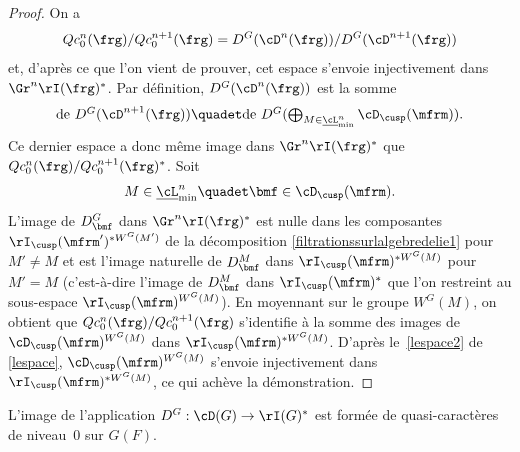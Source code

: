 \begin{proof}
On a
\[
Qc_{0}^n(\frg)/Qc_{0}^{n+1}(\frg)=D^G(\cD^n(\frg))/D^G(\cD^{n+1}(\frg))
\]
et, d'après ce que l'on vient de prouver, cet espace s'envoie injectivement dans $\Gr^n\rI(\frg)^*$.
Par définition, $D^G(\cD^n(\frg))$ est la somme
\[\textstyle
\text{de }D^G(\cD^{n+1}(\frg))\quadet \text{de }D^G(\bigoplus_{M\in \underline{\cL}_{\min}^n}\cD_{\cusp}(\mfrm)).
\]
Ce dernier espace a donc même image dans $\Gr^n\rI(\frg)^*$ que $Qc_{0}^n(\frg)/Qc_{0}^{n+1}(\frg)^*$. Soit
\[
M\in \underline{\cL}_{\min}^n\quadet \bmf\in \cD_{\cusp}(\mfrm).
\]
L'image de $D^G_{\bmf}$ dans $\Gr^n\rI(\frg)^*$ est nulle dans les composantes $\rI_{\cusp}(\mfrm')^{*W^G(M')}$ de la décomposition \eqref{filtrationssurlalgebredelie1} pour $M'\neq M$ et est l'image naturelle de $D^M_{\bmf}$ dans $\rI_{\cusp}(\mfrm)^{* W^G(M)}$ pour $M'=M$ (c'est-à-dire l'image de $D^M_{\bmf}$ dans $\rI_{\cusp}(\mfrm)^*$ que l'on restreint au sous-espace $\rI_{\cusp}(\mfrm)^{W^G(M)}$). En moyennant sur le groupe $ W^G(M)$, on obtient que $Qc_{0}^n(\frg)/Qc_{0}^{n+1}(\frg)$ s'identifie à la somme des images de $\cD_{\cusp}(\mfrm)^{W^G(M)}$ dans $\rI_{\cusp}(\mfrm)^{*W^G(M)}$.
D'après le~\eqref{lespace2} de \ref{lespace}, $\cD_{\cusp}(\mfrm)^{W^G(M)}$ s'envoie injectivement dans $\rI_{\cusp}(\mfrm)^{*W^G(M)}$, ce qui achève la démonstration.
\end{proof}

\label{unpremiertheoreme}

\begin{thm*}
L'image de l'application $D^G:\cD(G)\to \rI(G)^*$ est formée de quasi-caractères de niveau~$0$ sur $G(F)$.
\end{thm*}

